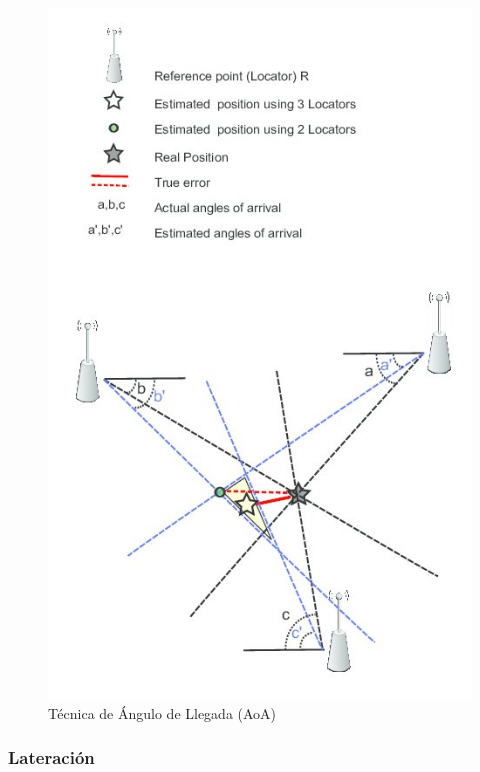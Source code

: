 \begin{enumerate}
{        \begin{figure}[h!]
            \centering
            \includegraphics[scale=1.2]{./images/aoa}
            \caption{Técnica de Ángulo de Llegada (AoA)}
            \label{fig:AoA}
        \end{figure}
        }
    \end{enumerate}

                \clearpage 

\subsubsection{\textbf{Lateración}}


